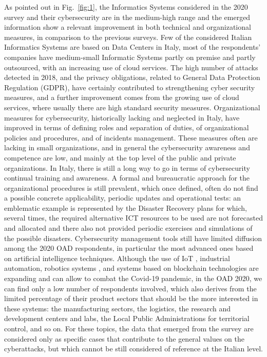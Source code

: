 \documentclass{easychair}
\begin{document}
As pointed out in Fig.~\ref{fig:1}, the Informatics Systems considered in the 2020 survey and their cybersecurity  are in the medium-high range and the emerged information show a relevant 
improvement in both technical and organizational measures, in comparison to the previous surveys. Few of the considered Italian Informatics Systems are based on Data Centers in 
Italy, most of the respondents’ companies have medium-small Informatic Systems partly on premise and partly outsourced, with an increasing use of cloud services.
The high number of attacks detected in 2018, and the privacy obligations, related to General Data Protection Regulation (GDPR), have certainly contributed to strengthening cyber security measures, and a further improvement 
comes from the growing use of cloud services, where usually there are high standard security measures. Organizational measures for cybersecurity, historically lacking and neglected
in Italy, have improved in terms of defining roles and separation of duties, of organizational policies and procedures, and of incidents management. These measures often are lacking
in small organizations, and in general the cybersecurity awareness and competence are low, and mainly at the top level of the public and private organizations. In Italy, there is 
still a long way to go in terms of cybersecurity continual training and awareness. A formal and bureaucratic approach for the organizational procedures is still prevalent, which 
once defined, often do not find a possible concrete applicability, periodic updates and operational tests: an emblematic example is represented by the Disaster Recovery plans for 
which, several times, the required alternative ICT resources to be used are not forecasted and allocated and there also not provided periodic exercises and simulations of the 
possible disasters. Cybersecurity management tools still have limited diffusion among the 2020 OAD respondents, in particular the most advanced ones based on artificial intelligence
techniques. Although the use of IoT \cite{JK21}, industrial automation, robotics systems \cite{SGLMDXHKCZT21}, and systems based on blockchain technologies \cite{RMFF21} are expanding and can allow to combat the Covid-19 pandemic, in 
the OAD 2020, we can find only a low number of respondents involved, which also derives from the limited percentage of their product sectors that should be the more interested in these systems: the manufacturing sectors, the logistics, the research and 
development centers and labs, the Local Public Administrations for territorial control, and so on. For these topics, the data that emerged from the survey are considered only as 
specific cases that contribute to the general values on the cyberattacks, but which cannot be still considered of reference at the Italian level.
\end{document}

